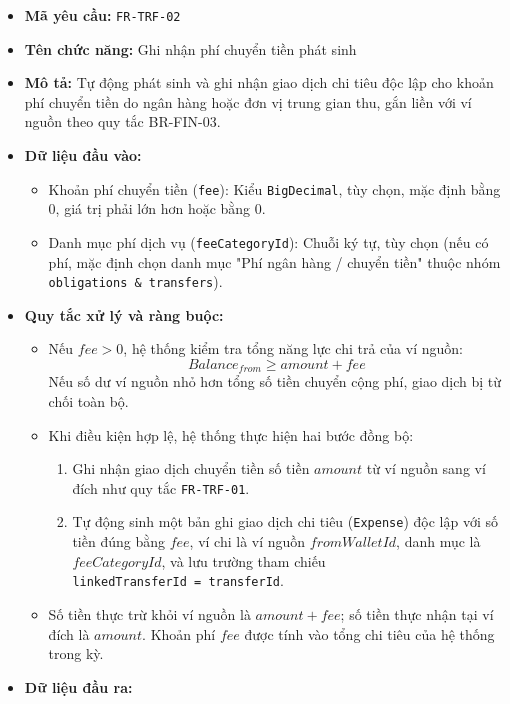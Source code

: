 \documentclass[11pt,a4paper]{article}
\providecommand{\tightlist}{
  \setlength{\itemsep}{0pt}\setlength{\parskip}{0pt}}
\begin{document}
\begin{itemize}
\tightlist
\item
  \textbf{Mã yêu cầu:} \texttt{FR-TRF-02}
\item
  \textbf{Tên chức năng:} Ghi nhận phí chuyển tiền phát sinh
\item
  \textbf{Mô tả:} Tự động phát sinh và ghi nhận giao dịch chi tiêu độc
  lập cho khoản phí chuyển tiền do ngân hàng hoặc đơn vị trung gian thu,
  gắn liền với ví nguồn theo quy tắc BR-FIN-03.
\item
  \textbf{Dữ liệu đầu vào:}

  \begin{itemize}
  \tightlist
  \item
    Khoản phí chuyển tiền (\texttt{fee}): Kiểu \texttt{BigDecimal}, tùy
    chọn, mặc định bằng 0, giá trị phải lớn hơn hoặc bằng 0.
  \item
    Danh mục phí dịch vụ (\texttt{feeCategoryId}): Chuỗi ký tự, tùy chọn
    (nếu có phí, mặc định chọn danh mục "Phí ngân hàng / chuyển tiền"
    thuộc nhóm \texttt{obligations\ \&\ transfers}).
  \end{itemize}
\item
  \textbf{Quy tắc xử lý và ràng buộc:}

  \begin{itemize}
  \tightlist
  \item
    Nếu \(fee > 0\), hệ thống kiểm tra tổng năng lực chi trả của ví
    nguồn: \[Balance_{from} \ge amount + fee\] Nếu số dư ví nguồn nhỏ
    hơn tổng số tiền chuyển cộng phí, giao dịch bị từ chối toàn bộ.
  \item
    Khi điều kiện hợp lệ, hệ thống thực hiện hai bước đồng bộ:

    \begin{enumerate}
    \def\labelenumi{\arabic{enumi}.}
    \tightlist
    \item
      Ghi nhận giao dịch chuyển tiền số tiền \(amount\) từ ví nguồn sang
      ví đích như quy tắc \texttt{FR-TRF-01}.
    \item
      Tự động sinh một bản ghi giao dịch chi tiêu (\texttt{Expense}) độc
      lập với số tiền đúng bằng \(fee\), ví chi là ví nguồn
      \(fromWalletId\), danh mục là \(feeCategoryId\), và lưu trường
      tham chiếu \texttt{linkedTransferId\ =\ transferId}.
    \end{enumerate}
  \item
    Số tiền thực trừ khỏi ví nguồn là \(amount + fee\); số tiền thực
    nhận tại ví đích là \(amount\). Khoản phí \(fee\) được tính vào tổng
    chi tiêu của hệ thống trong kỳ.
  \end{itemize}
\item
  \textbf{Dữ liệu đầu ra:}


\end{itemize}
\end{document}
